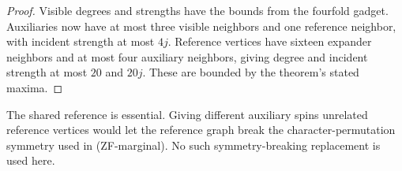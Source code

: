 \begin{proof}
Visible degrees and strengths have the bounds from the fourfold
gadget.  Auxiliaries now have at most three visible neighbors and one
reference neighbor, with incident strength at most $4j$.  Reference
vertices have sixteen expander neighbors and at most four auxiliary
neighbors, giving degree and incident strength at most $20$ and
$20j$.  These are bounded by the theorem's stated maxima.
\end{proof}

The shared reference is essential.  Giving different auxiliary spins
unrelated reference vertices would let the reference graph break the
character-permutation symmetry used in (ZF-marginal).  No such
symmetry-breaking replacement is used here.
